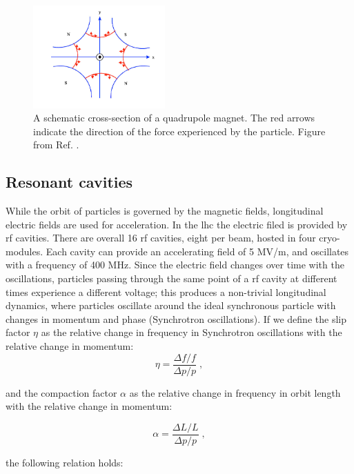 \begin{figure}[ht]
\centering
\includegraphics[width=0.45\textwidth]{figures/lhc/figures_quad}
\caption{A schematic cross-section of a quadrupole magnet. The red arrows indicate the direction of the force experienced by the particle. Figure from Ref. \cite{Kain:2016aly}.}
\label{fig:lhc:quad}
\end{figure}

\subsection{Resonant cavities}

While the orbit of particles is governed by the magnetic fields, longitudinal electric fields are used for acceleration. In the \gls{lhc} the electric filed is provided by \gls{rf} cavities. There are overall 16 \gls{rf} cavities, eight per beam, hosted in four cryo-modules. Each cavity can provide an accelerating field of 5 MV/m, and oscillates with a frequency of 400 MHz. Since the electric field changes over time with the oscillations, particles passing through the same point of a \gls{rf} cavity at different times experience a different voltage; this produces a non-trivial longitudinal dynamics, where particles oscillate around the ideal synchronous particle with changes in momentum and phase (Synchrotron oscillations). If we define the slip factor $\eta$ as the relative change in frequency in Synchrotron oscillations with the relative change in momentum:
\begin{equation}
\eta = \frac{\Delta f / f}{\Delta p / p} \; ,
\end{equation}

\noindent and the compaction factor $\alpha$ as the relative change in frequency in orbit length with the relative change in momentum:

\begin{equation}
\alpha = \frac{\Delta L / L}{\Delta p / p} \; ,
\end{equation}

\noindent the following relation holds:

